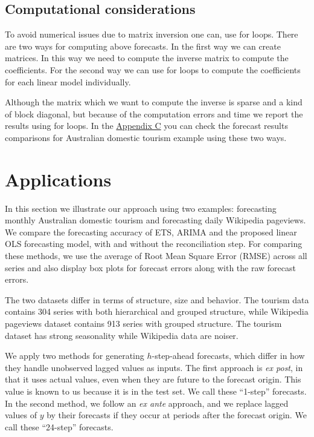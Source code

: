\documentclass[11pt,a4paper,]{article}
\begin{document}
\hypertarget{computational-considerations}{%
\subsection{Computational considerations}\label{computational-considerations}}

To avoid numerical issues due to matrix inversion one can, use for loops. There are two ways for computing above forecasts. In the first way we can create matrices. In this way we need to compute the inverse matrix to compute the coefficients. For the second way we can use for loops to compute the coefficients for each linear model individually.

Although the matrix which we want to compute the inverse is sparse and a kind of block diagonal, but because of the computation errors and time we report the results using for loops. In the \protect\hyperlink{appendixC}{Appendix C} you can check the forecast results comparisons for Australian domestic tourism example using these two ways.

\hypertarget{applications}{%
\section{Applications}\label{applications}}

In this section we illustrate our approach using two examples: forecasting monthly Australian domestic tourism and forecasting daily Wikipedia pageviews. We compare the forecasting accuracy of ETS, ARIMA and the proposed linear OLS forecasting model, with and without the reconciliation step. For comparing these methods, we use the average of Root Mean Square Error (RMSE) across all series and also display box plots for forecast errors along with the raw forecast errors.

The two datasets differ in terms of structure, size and behavior. The tourism data contains 304 series with both hierarchical and grouped structure, while Wikipedia pageviews dataset contains 913 series with grouped structure. The tourism dataset has strong seasonality while Wikipedia data are noiser.

We apply two methods for generating \(h\)-step-ahead forecasts, which differ in how they handle unobserved lagged values as inputs. The first approach is \emph{ex post}, in that it uses actual values, even when they are future to the forecast origin. This value is known to us because it is in the test set. We call these ``1-step'' forecasts. In the second method, we follow an \emph{ex ante} approach, and we replace lagged values of \(y\) by their forecasts if they occur at periods after the forecast origin. We call these ``24-step'' forecasts.
\end{document}
